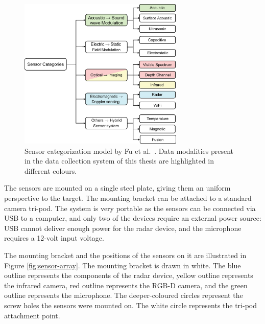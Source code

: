 \begin{figure}[H]
    \centering
    \includegraphics[width=0.7\textwidth]{fig/2/sensor-categories.eps}
    \caption{
        Sensor categorization model by Fu et al.~\cite{sensing-survey}.
        Data modalities present in the data collection system of this thesis are highlighted in different colours.
    }
    \label{fig:sensor-categories}
\end{figure}

The sensors are mounted on a single steel plate,
giving them an uniform perspective to the target.
The mounting bracket can be attached to a standard camera tri-pod.
The system is very portable as the sensors can be connected via USB to a computer,
and only two of the devices require an external power source:
USB cannot deliver enough power for the radar device, and the microphone requires a 12-volt input voltage.

The mounting bracket and the positions of the sensors on it are illustrated in Figure \ref{fig:sensor-array}.
The mounting bracket is drawn in white.
The blue outline represents the components of the radar device,
yellow outline represents the infrared camera,
red outline represents the RGB-D camera,
and the green outline represents the microphone.
The deeper-coloured circles represent the screw holes the sensors were mounted on.
The white circle represents the tri-pod attachment point.

